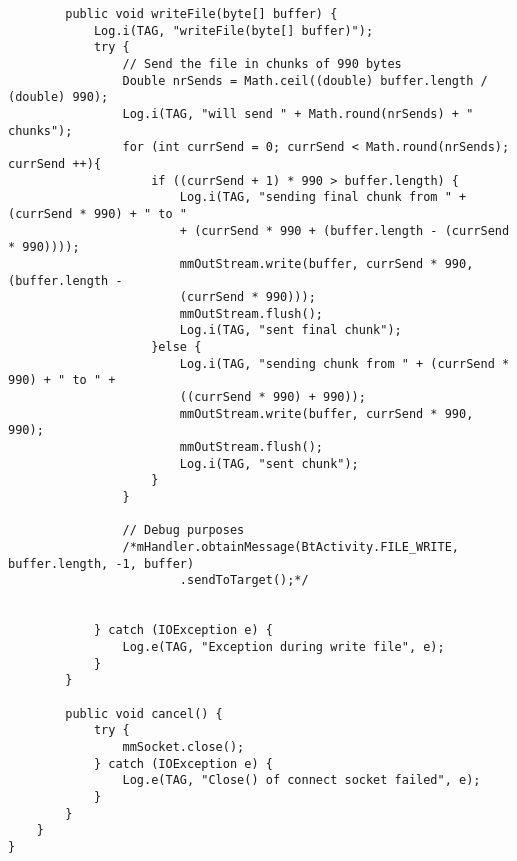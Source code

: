 \begin{verbatim}
        public void writeFile(byte[] buffer) {
            Log.i(TAG, "writeFile(byte[] buffer)");
            try {
                // Send the file in chunks of 990 bytes
                Double nrSends = Math.ceil((double) buffer.length / (double) 990);
                Log.i(TAG, "will send " + Math.round(nrSends) + " chunks");
                for (int currSend = 0; currSend < Math.round(nrSends); currSend ++){
                    if ((currSend + 1) * 990 > buffer.length) {
                        Log.i(TAG, "sending final chunk from " + (currSend * 990) + " to "
                        + (currSend * 990 + (buffer.length - (currSend * 990))));
                        mmOutStream.write(buffer, currSend * 990, (buffer.length -
                        (currSend * 990)));
                        mmOutStream.flush();
                        Log.i(TAG, "sent final chunk");
                    }else {
                        Log.i(TAG, "sending chunk from " + (currSend * 990) + " to " + 
                        ((currSend * 990) + 990));
                        mmOutStream.write(buffer, currSend * 990, 990);
                        mmOutStream.flush();
                        Log.i(TAG, "sent chunk");
                    }
                }

                // Debug purposes
                /*mHandler.obtainMessage(BtActivity.FILE_WRITE, buffer.length, -1, buffer)
                        .sendToTarget();*/


            } catch (IOException e) {
                Log.e(TAG, "Exception during write file", e);
            }
        }

        public void cancel() {
            try {
                mmSocket.close();
            } catch (IOException e) {
                Log.e(TAG, "Close() of connect socket failed", e);
            }
        }
    }
}
\end{verbatim}







